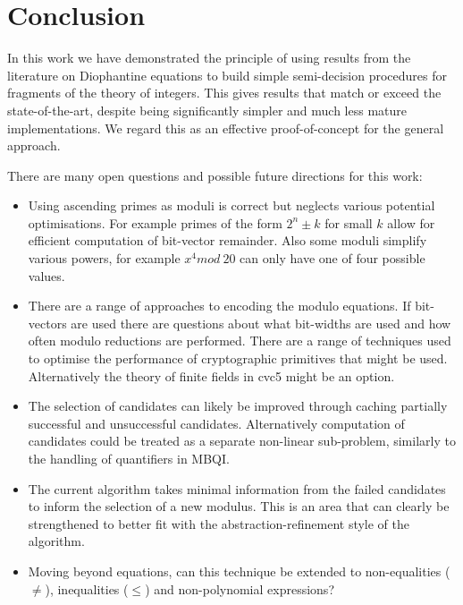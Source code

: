 \section{Conclusion}
\label{section:conclusion}

%

In this work we have demonstrated the principle of using results from
the literature on Diophantine equations to build simple semi-decision
procedures for fragments of the theory of integers.
%
This gives results that match or exceed the state-of-the-art, despite
being significantly simpler and much less mature implementations.
%
We regard this as an effective proof-of-concept for the general approach.



There are many open questions and possible future directions for this work:

\begin{itemize}
\item{Using ascending primes as moduli is correct but neglects various
  potential optimisations.  For example primes of the form $2^n \pm k$
  for small $k$ allow for efficient computation of bit-vector
  remainder.  Also some moduli simplify various powers, for example
  $x^4 mod\ 20$ can only have one of four possible values.}

\item{There are a range of approaches to encoding the modulo
  equations.
  If bit-vectors are used there are questions about what
  bit-widths are used and how often modulo reductions are performed.
  There are a range of techniques used to optimise the performance of
  cryptographic primitives that might be used.
  Alternatively the theory of finite fields in cvc5 might be an option.}
  
\item{The selection of candidates can likely be improved through
  caching partially successful and unsuccessful candidates.
  Alternatively computation of candidates could be treated as a
  separate non-linear sub-problem, similarly to the handling of
  quantifiers in MBQI.}

\item{The current algorithm takes minimal information from the failed
  candidates to inform the selection of a new modulus.  This is an
  area that can clearly be strengthened to better fit with the
  abstraction-refinement style of the algorithm.}

\item{Moving beyond equations, can this technique be extended to
  non-equalities ($\not=$), inequalities ($\leq$) and non-polynomial
  expressions?}
\end{itemize}
